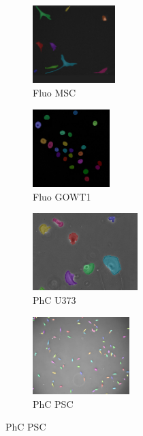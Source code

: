 \documentclass[../cellseek_paper.tex]{subfiles}
\begin{document}
\begin{figure}[H]
  \vspace{0.8em}

  \begin{subfigure}{0.23\textwidth}
    \centering
    \includegraphics[width=\textwidth,height=3cm]{images/examples/msc_segmented.jpg}
    \caption{\footnotesize Fluo MSC}
    \label{fig:msc}
  \end{subfigure}
  \hfill
  \begin{subfigure}{0.23\textwidth}
    \centering
    \includegraphics[width=\textwidth,height=3cm]{images/examples/gowt1_segmented.jpg}
    \caption{\footnotesize Fluo GOWT1}
    \label{fig:gowt1}
  \end{subfigure}
  \hfill
  \begin{subfigure}{0.23\textwidth}
    \centering
    \includegraphics[width=\textwidth,height=3cm]{images/examples/u373_segmented.jpg}
    \caption{\footnotesize PhC U373}
    \label{fig:u373}
  \end{subfigure}
  \hfill
  \begin{subfigure}{0.23\textwidth}
    \centering
    \includegraphics[width=\textwidth,height=3cm]{images/examples/psc_segmented.jpg}
    \caption{\footnotesize PhC PSC}
    \label{fig:psc}
  \end{subfigure}


\end{figure}
\end{document}
